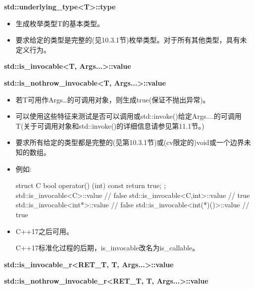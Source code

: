 \textbf{std::underlying\_type<T>::type}

\begin{itemize}
\item 
生成枚举类型T的基本类型。

\item 
要求给定的类型是完整的(见10.3.1节)枚举类型。对于所有其他类型，具有未定义行为。
\end{itemize}

\textbf{std::is\_invocable<T, Args...>::value}

\textbf{std::is\_nothrow\_invocable<T, Args...>::value}

\begin{itemize}
\item 
若T可用作Args…的可调用对象，则生成true(保证不抛出异常)。

\item 
可以使用这些特征来测试是否可以调用或std::invoke()给定Args....的可调用T(关于可调用对象和std::invoke()的详细信息请参见第11.1节。)

\item 
要求所有给定的类型都是完整的(见第10.3.1节)或(cv限定的)void或一个边界未知的数组。

\item 
例如:
\begin{cpp}
struct C {
	bool operator() (int) const {
		return true;
	}
};
std::is_invocable<C>::value // false
std::is_invocable<C,int>::value // true
std::is_invocable<int*>::value // false
std::is_invocable<int(*)()>::value // true
\end{cpp}

\item 
C++17之后可用。

\begin{notice}
C++17标准化过程的后期，is\_invocable改名为is\_callable。
\end{notice}
\end{itemize}

\textbf{std::is\_invocable\_r<RET\_T, T, Args...>::value}

\textbf{std::is\_nothrow\_invocable\_r<RET\_T, T, Args...>::value}

